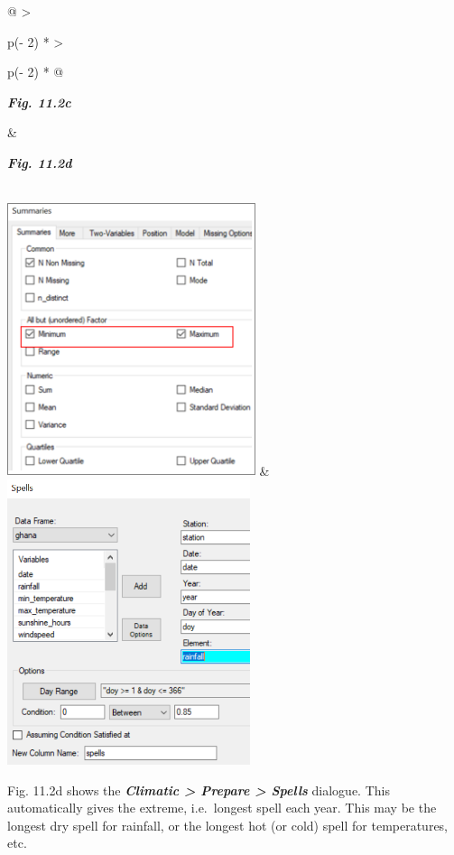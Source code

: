 \documentclass[
  letterpaper,
  DIV=11,
  numbers=noendperiod]{scrreprt}
\begin{document}
\begin{longtable}[]{@{}
  >{\raggedright\arraybackslash}p{(\columnwidth - 2\tabcolsep) * }
  >{\raggedright\arraybackslash}p{(\columnwidth - 2\tabcolsep) * }@{}}
\toprule\noalign{}
\begin{minipage}[b]{\linewidth}\raggedright
\textbf{\emph{Fig. 11.2c}}
\end{minipage} & \begin{minipage}[b]{\linewidth}\raggedright
\textbf{\emph{Fig. 11.2d}}
\end{minipage} \\
\midrule\noalign{}
\endhead
\bottomrule\noalign{}
\endlastfoot
\includegraphics[width=2.86209in,height=3.15145in]{figures/Fig11.2c.png}
&
\includegraphics[width=2.80257in,height=3.28784in]{figures/Fig11.2d.png} \\
\end{longtable}

Fig. 11.2d shows the \textbf{\emph{Climatic \textgreater{} Prepare
\textgreater{} Spells}} dialogue. This automatically gives the extreme,
i.e.~longest spell each year. This may be the longest dry spell for
rainfall, or the longest hot (or cold) spell for temperatures, etc.
\end{document}
